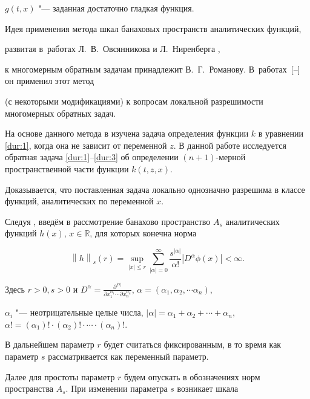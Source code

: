 $g(t,x)$ "--- заданная достаточно гладкая функция.





Идея применения  метода шкал банаховых пространств аналитических функций,

развитая в~работах Л.~В.~Овсянникова \cite{dur:bib:1} и Л.~Ниренберга \cite{dur:bib:2},

к многомерным обратным задачам принадлежит В.~Г.~Романову. В~работах~[--] он применил этот метод

(с некоторыми модификациями)        к вопросам локальной разрешимости многомерных обратных задач. 

На основе данного метода в \cite{dur:bib:6} изучена задача определения функции $k$ в уравнении \eqref{dur:1}, когда она не зависит от переменной $z$. В данной  работе исследуется обратная задача \eqref{dur:1}--\eqref{dur:3} об определении $(n+1)$-мерной пространственной части функции $k(t,z,x)$.

        Доказывается, что поставленная задача локально однозначно разрешима в классе функций, аналитических по переменной $x$.



         Следуя \cite[с. 92]{dur:bib:7}, введём в рассмотрение  банахово пространство $A_s$ аналитических функций  $h(x)$, $x \in \mathbb R$,  для которых  конечна норма

\[{\left\| h \right\|_s}(r) = \mathop {\sup }\limits_{\left| x \right| \leqslant r} \sum\limits_{\left| \alpha  \right| = 0}^\infty  {\frac{{{s^{\left| \alpha  \right|}}}}{{\alpha !}}} \left| {{D^\alpha }\phi (x)} \right| < \infty .\]

     Здесь $r > 0,s > 0$ и $D^\alpha = \frac{{{\partial ^{\left| \alpha  \right|}}}}{{\partial x_1^{{\alpha _1}} \cdots \partial x_n^{{\alpha _n}}}}$,      $\alpha  = \left( {{\alpha _1},{\alpha _2}, \cdots {\alpha _n}} \right)$,

      ${\alpha _i}$ "--- неотрицательные целые числа, $\left| \alpha  \right| = {\alpha _1} + {\alpha _2} +  \cdots  + {\alpha _n}$,   $\alpha ! = ({\alpha _1})! \cdot ({\alpha _2})! \cdot  \cdots  \cdot ({\alpha _n})!$.

      В дальнейшем параметр $r$ будет считаться фиксированным, в то время как параметр $s$ рассматривается как переменный параметр.

       Далее для простоты параметр $r$ будем опускать в обозначениях норм пространства  ${A_s}$. При изменении  параметра $s$ возникает шкала

